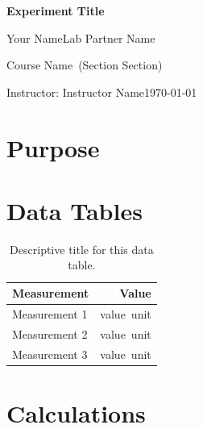 \documentclass[
	11pt,
	letterpaper,
]{article}
\newcommand{\reporttitle}{Experiment Title}
\newcommand{\reportauthor}{Your Name}
\newcommand{\reportpartner}{Lab Partner Name}
\newcommand{\reportinstructor}{Instructor Name}
\newcommand{\reportcourse}{Course Name}
\newcommand{\reportsection}{Section}
\newcommand{\reportdate}{\today}
\begin{document}
\begin{center}
{\Large\bfseries \reporttitle \par}
\vspace{0.3cm}
{\normalsize \reportauthor \quad \reportpartner \par}
\vspace{0.2cm}
{\small \reportcourse\ (Section \reportsection) \par}
{\small Instructor: \reportinstructor \quad \reportdate \par}
\end{center}

\vspace{0.5cm}

\section{Purpose}


\vspace{1em}


\section{Data Tables}


\begin{table}[htbp]
	\centering
	\caption{Descriptive title for this data table.}
	\label{tab:data1}
	\begin{tabular}{@{}lr@{}}
		\toprule
		\textbf{Measurement} & \textbf{Value} \\
		\midrule
		Measurement 1 & \SI{value}{unit} \\
		Measurement 2 & \SI{value}{unit} \\
		Measurement 3 & \SI{value}{unit} \\
		\bottomrule
	\end{tabular}
\end{table}


\section{Calculations}
\end{document}
